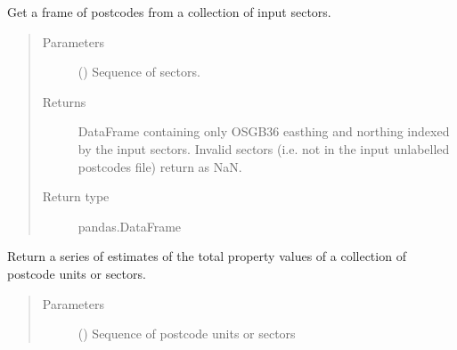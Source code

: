 \documentclass[letterpaper,10pt,english]{sphinxmanual}
\begin{document}
\begin{fulllineitems}
\begin{fulllineitems}
\begin{quote}
\begin{description}
\end{description}\end{quote}

\end{fulllineitems}


\begin{fulllineitems}
\label{\detokenize{index:flood_tool.Tool.get_postcode_from_sector}}
\sphinxAtStartPar
Get a frame of postcodes from a collection
of input sectors.
\begin{quote}\begin{description}
\item[{Parameters}] \leavevmode
\sphinxAtStartPar
{} () \textendash{} Sequence of sectors.

\item[{Returns}] \leavevmode
\sphinxAtStartPar
DataFrame containing only OSGB36 easthing and northing indexed
by the input sectors. Invalid sectors (i.e. not in the
input unlabelled postcodes file) return as NaN.

\item[{Return type}] \leavevmode
\sphinxAtStartPar
pandas.DataFrame

\end{description}\end{quote}

\end{fulllineitems}


\begin{fulllineitems}
\label{\detokenize{index:flood_tool.Tool.get_total_value}}
\sphinxAtStartPar
Return a series of estimates of the total property values
of a collection of postcode units or sectors.
\begin{quote}\begin{description}
\item[{Parameters}] \leavevmode
\sphinxAtStartPar
{} () \textendash{} Sequence of postcode units or sectors


\end{description}
\end{quote}
\end{fulllineitems}
\end{fulllineitems}
\end{document}
